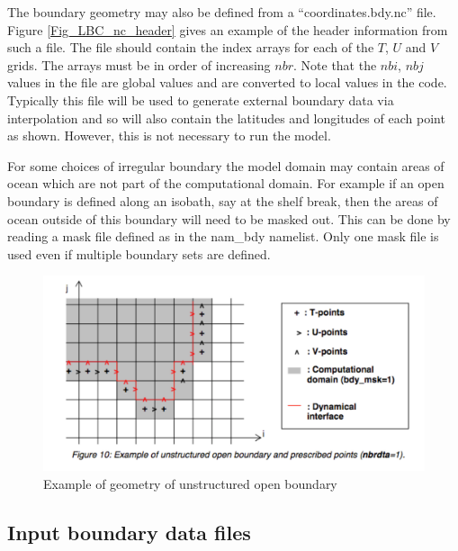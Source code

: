 The boundary geometry may also be defined from a
``coordinates.bdy.nc'' file. Figure \ref{Fig_LBC_nc_header}
gives an example of the header information from such a file. The file
should contain the index arrays for each of the $T$, $U$ and $V$
grids. The arrays must be in order of increasing $nbr$. Note that the
$nbi$, $nbj$ values in the file are global values and are converted to
local values in the code. Typically this file will be used to generate
external boundary data via interpolation and so will also contain the
latitudes and longitudes of each point as shown. However, this is not
necessary to run the model. 

For some choices of irregular boundary the model domain may contain
areas of ocean which are not part of the computational domain. For
example if an open boundary is defined along an isobath, say at the
shelf break, then the areas of ocean outside of this boundary will
need to be masked out. This can be done by reading a mask file defined
as  in the nam\_bdy namelist. Only one mask file is
used even if multiple boundary sets are defined.

\begin{figure}[!t]      \begin{center}
\includegraphics[width=1.0\textwidth]{./TexFiles/Figures/Fig_LBC_bdy_geom.pdf}
\caption {      \label{Fig_LBC_bdy_geom}
Example of geometry of unstructured open boundary}
\end{center}   \end{figure}

\subsection{Input boundary data files}
\label{BDY_data}

